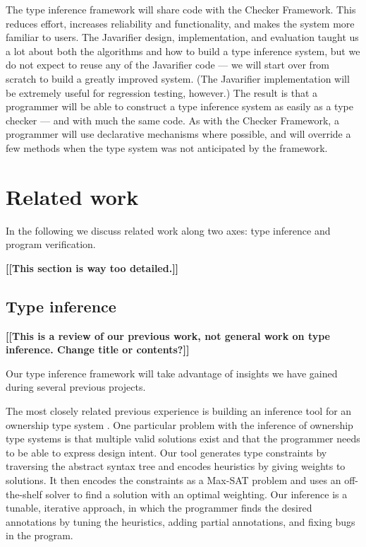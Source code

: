 \documentclass[preprint]{sig-alternate}
\newcommand{\todo}[1]{{\color{red}\bfseries [[#1]]}}
\begin{document}
The type inference framework will share code with the Checker
Framework.  This reduces effort, increases reliability and
functionality, and makes the system more familiar to users.  The
Javarifier design, implementation, and evaluation taught us a lot
about both the algorithms and how to build a type inference system,
but we do not expect to reuse any of the Javarifier code --- we will
start over from scratch to build a greatly improved system.  (The
Javarifier implementation will be extremely useful for regression
testing, however.)  The result is that a programmer will be able to
construct a type inference system as easily as a type checker --- and
with much the same code.  As with the Checker Framework, a programmer
will use declarative mechanisms where possible, and will override a
few methods when the type system was not anticipated by the framework.


\section{Related work}
\label{sec:related-work}

In the following we discuss related work along two axes: type
inference and program verification.

\todo{This section is way too detailed.}


\subsection{Type inference}
\label{sec:type-inference-previous}

\todo{This is a review of our previous work, not general work on type
  inference. Change title or contents?}

Our type inference framework will take advantage of insights we have
gained during several previous projects.

The most closely related previous experience is building an inference
tool \cite{DietlEM2011} for an ownership type system
\cite{DietlPhD09}.  One particular problem with the inference of
ownership type systems is that multiple valid solutions exist and that
the programmer needs to be able to express design intent.  Our tool
generates type constraints by traversing the abstract syntax tree and
encodes heuristics by giving weights to solutions.  It then encodes
the constraints as a Max-SAT problem and uses an off-the-shelf solver
to find a solution with an optimal weighting.  Our inference is a
tunable, iterative approach, in which the programmer finds the desired
annotations by tuning the heuristics, adding partial annotations, and
fixing bugs in the program.
\end{document}
